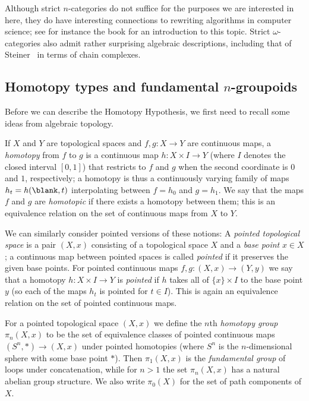 \documentclass[a4paper,12pt]{article}
\begin{document}
\begin{remark}
  Although strict $n$-categories do not suffice for the purposes we
  are interested in here, they do have interesting connections to
  rewriting algorithms in computer science; see for instance the book
  \cite{Polygraphs} for an introduction to this topic. Strict
  $\omega$-categories also admit rather surprising algebraic
  descriptions, including that of Steiner~\cite{Steiner} in terms of
  chain complexes.
\end{remark}


\subsection{Homotopy types and fundamental $n$-groupoids}\label{subsec:htpy}
Before we can describe the Homotopy Hypothesis, we first need to
recall some ideas from algebraic topology.

\begin{defn}
  If $X$ and $Y$ are topological spaces and $f,g \colon X \to Y$ are
  continuous maps, a \emph{homotopy} from $f$ to $g$ is a continuous
  map $h \colon X \times I \to Y$ (where $I$ denotes the closed
  interval $[0,1]$) that restricts to $f$ and $g$ when the second
  coordinate is $0$ and $1$, respectively; a homotopy is thus a
  continuously varying family of maps $h_{t} = h(\blank,t)$
  interpolating between $f=h_{0}$ and $g=h_{1}$. We say that the maps
  $f$ and $g$ are \emph{homotopic} if there exists a homotopy between
  them; this is an equivalence relation on the set of continuous maps
  from $X$ to $Y$.
\end{defn}

\begin{variant}
  We can similarly consider pointed versions of these notions: A
  \emph{pointed topological space} is a pair $(X,x)$ consisting of a
  topological space $X$ and a \emph{base point} $x \in X$; a
  continuous map between pointed spaces is called \emph{pointed} if it
  preserves the given base points. For pointed continuous maps
  $f,g \colon (X,x) \to (Y,y)$ we say that a homotopy
  $h \colon X \times I \to Y$ is \emph{pointed} if $h$ takes all of
  $\{x\} \times I$ to the base point $y$ (so each of the maps $h_{t}$
  is pointed for $t \in I$). This is again an equivalence relation on
  the set of pointed continuous maps.
\end{variant}

\begin{defn}
  For a pointed topological space $(X,x)$ we define the $n$th
  \emph{homotopy group} $\pi_{n}(X,x)$ to be the set of equivalence
  classes of pointed continuous maps $(S^{n},*) \to (X,x)$ under
  pointed homotopies (where $S^{n}$ is the $n$-dimensional sphere with
  some base point $*$). Then $\pi_{1}(X,x)$ is the \emph{fundamental
    group} of loops under concatenation, while for $n > 1$ the set
  $\pi_{n}(X,x)$ has a natural abelian group structure. We also write
  $\pi_{0}(X)$ for the set of path components of $X$.
\end{defn}
\end{document}
